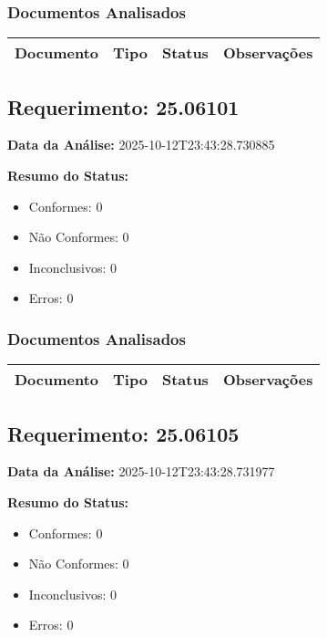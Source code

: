 \documentclass[12pt,a4paper]{article}
\begin{document}
\subsubsection{Documentos Analisados}

\begin{longtable}{|p{4cm}|p{2cm}|p{2cm}|p{6cm}|}
\hline
\textbf{Documento} & \textbf{Tipo} & \textbf{Status} & \textbf{Observações} \\
\hline
\endhead
\end{longtable}


\subsection{Requerimento: 25.06101}

\textbf{Data da Análise:} 2025-10-12T23:43:28.730885

\textbf{Resumo do Status:}
\begin{itemize}
    \item Conformes: 0
    \item Não Conformes: 0
    \item Inconclusivos: 0
    \item Erros: 0
\end{itemize}

\subsubsection{Documentos Analisados}

\begin{longtable}{|p{4cm}|p{2cm}|p{2cm}|p{6cm}|}
\hline
\textbf{Documento} & \textbf{Tipo} & \textbf{Status} & \textbf{Observações} \\
\hline
\endhead
\end{longtable}


\subsection{Requerimento: 25.06105}

\textbf{Data da Análise:} 2025-10-12T23:43:28.731977

\textbf{Resumo do Status:}
\begin{itemize}
    \item Conformes: 0
    \item Não Conformes: 0
    \item Inconclusivos: 0
    \item Erros: 0
\end{itemize}
\end{document}
